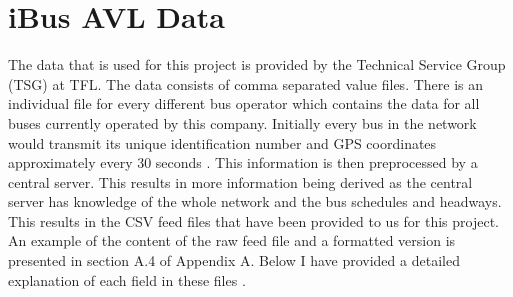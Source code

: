 \section{iBus AVL Data}
The data that is used for this project is provided by the Technical Service Group (TSG) at TFL. The data consists of comma separated value files. There is an individual file for every different bus operator which contains the data for all buses currently operated by this company. Initially every bus in the network would transmit its unique identification number and GPS coordinates approximately every 30 seconds \cite{Hounsell201276}. This information is then preprocessed by a central server. This results in more information being derived as the central server has knowledge of the whole network and the bus schedules and headways. This results in the CSV feed files that have been provided to us for this project. An example of the content of the raw feed file and a formatted version is presented in section A.4 of Appendix A. Below I have provided a detailed explanation of each field in these files \cite{infoBusesInservice}.
